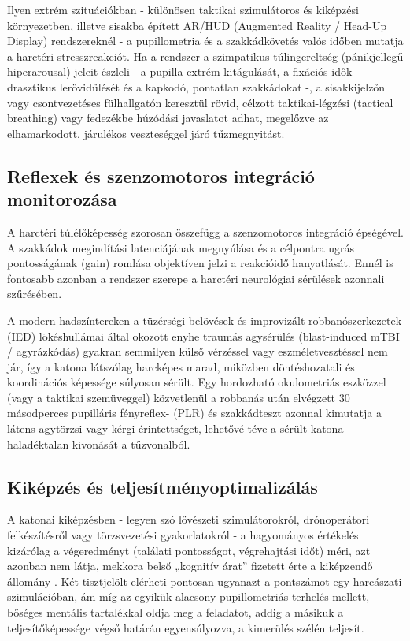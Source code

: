 \documentclass[12pt,a4paper,oneside]{book}
\begin{document}
Ilyen extrém szituációkban - különösen taktikai szimulátoros és kiképzési környezetben, illetve sisakba épített AR/HUD (Augmented Reality / Head-Up Display) rendszereknél - a pupillometria és a szakkádkövetés valós időben mutatja a harctéri stresszreakciót. Ha a rendszer a szimpatikus túlingereltség (pánikjellegű hiperarousal) jeleit észleli - a pupilla extrém kitágulását, a fixációs idők drasztikus lerövidülését és a kapkodó, pontatlan szakkádokat -, a sisakkijelzőn vagy csontvezetéses fülhallgatón keresztül rövid, célzott taktikai-légzési (tactical breathing) vagy fedezékbe húzódási javaslatot adhat, megelőzve az elhamarkodott, járulékos veszteséggel járó tűzmegnyitást.

\subsection{Reflexek és szenzomotoros integráció monitorozása}

A harctéri túlélőképesség szorosan összefügg a szenzomotoros integráció épségével. A szakkádok megindítási latenciájának megnyúlása és a célpontra ugrás pontosságának (gain) romlása objektíven jelzi a reakcióidő hanyatlását. Ennél is fontosabb azonban a rendszer szerepe a harctéri neurológiai sérülések azonnali szűrésében.

A modern hadszíntereken a tüzérségi belövések és improvizált robbanószerkezetek (IED) lökéshullámai által okozott enyhe traumás agysérülés (blast-induced mTBI / agyrázkódás) gyakran semmilyen külső vérzéssel vagy eszméletvesztéssel nem jár, így a katona látszólag harcképes marad, miközben döntéshozatali és koordinációs képessége súlyosan sérült. Egy hordozható okulometriás eszközzel (vagy a taktikai szemüveggel) közvetlenül a robbanás után elvégzett 30 másodperces pupilláris fényreflex- (PLR) és szakkádteszt azonnal kimutatja a látens agytörzsi vagy kérgi érintettséget, lehetővé téve a sérült katona haladéktalan kivonását a tűzvonalból.

\subsection{Kiképzés és teljesítményoptimalizálás}

A katonai kiképzésben - legyen szó lövészeti szimulátorokról, drónoperátori felkészítésről vagy törzsvezetési gyakorlatokról - a hagyományos értékelés kizárólag a végeredményt (találati pontosságot, végrehajtási időt) méri, azt azonban nem látja, mekkora belső „kognitív árat” fizetett érte a kiképzendő állomány \cite{twabu2025}. Két tisztjelölt elérheti pontosan ugyanazt a pontszámot egy harcászati szimulációban, ám míg az egyikük alacsony pupillometriás terhelés mellett, bőséges mentális tartalékkal oldja meg a feladatot, addig a másikuk a teljesítőképessége végső határán egyensúlyozva, a kimerülés szélén teljesít.
\end{document}
